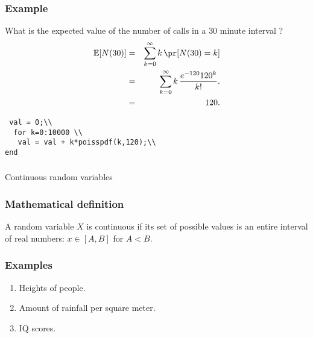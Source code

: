 \begin{frame}[fragile]\frametitle{Example}

What is the expected value of the number of calls
in a $30$ minute interval ? \\ 

\begin{eqnarray*}
\mathbb E[N(30)] &= &\sum_{k=0}^{\infty} k \, \pr[N(30) = k] \\ 
 &=& \sum_{k=0}^\infty k \, \frac{e^{-120} 120^k}{k!}. \\ 
& = & 120. 
\end{eqnarray*}

\begin{lstlisting} 
 val = 0;\\
  for k=0:10000 \\
   val = val + k*poisspdf(k,120);\\
end
\end{lstlisting}

\end{frame}

\begin{frame}[fragile]\frametitle{}
\begin{center}
{\Large Continuous random variables}

\end{center}
\end{frame}



\begin{frame}[fragile]\frametitle{Mathematical definition}

\begin{defn}
A random variable $X$ is continuous if its set of possible values is an
entire interval of real numbers: $x \in [A,B]$ for $A < B$. 
\end{defn}

\end{frame}


\begin{frame}[fragile]\frametitle{Examples}

\begin{enumerate}

\item Heights of people. 

\item Amount of rainfall per square meter. 

\item IQ scores. 

\end{enumerate}


\end{frame}

